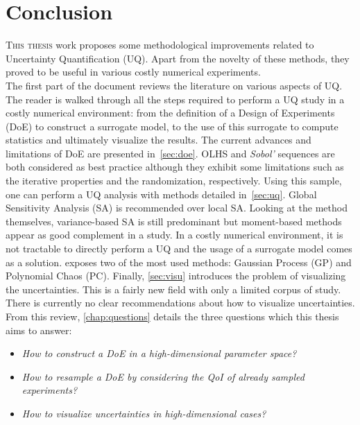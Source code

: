 \chapter*{Conclusion}

\lettrine{T}{his thesis} work proposes some methodological improvements related to Uncertainty Quantification (UQ). Apart from the novelty of these methods, they proved to be useful in various costly numerical experiments.\\

The first part of the document reviews the literature on various aspects of UQ. The reader is walked through all the steps required to perform a UQ study in a costly numerical environment: from the definition of a Design of Experiments (DoE) to construct a surrogate model, to the use of this surrogate to compute statistics and ultimately visualize the results. The current advances and limitations of DoE are presented in~\cref{sec:doe}. OLHS and \emph{Sobol'} sequences are both considered as best practice although they exhibit some limitations such as the iterative properties and the randomization, respectively. Using this sample, one can perform a UQ analysis with methods detailed in~\cref{sec:uq}. Global Sensitivity Analysis (SA) is recommended over local SA. Looking at the method themselves, variance-based SA is still predominant but moment-based methods appear as good complement in a study. In a costly numerical environment, it is not tractable to directly perform a UQ and the usage of a surrogate model comes as a solution.  exposes two of the most used methods: Gaussian Process (GP) and Polynomial Chaos (PC). Finally, \cref{sec:visu} introduces the problem of visualizing the uncertainties. This is a fairly new field with only a limited corpus of study. There is currently no clear recommendations about how to visualize uncertainties. From this review, \cref{chap:questions} details the three questions which this thesis aims to answer:
\begin{itemize}
\item \emph{How to construct a DoE in a high-dimensional parameter space?}
\item \emph{How to resample a DoE by considering the QoI of already sampled experiments?}
\item \emph{How to visualize uncertainties in high-dimensional cases?}
\end{itemize}

